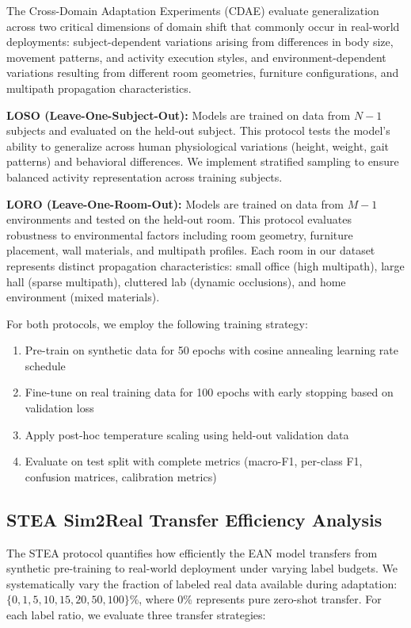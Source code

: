 \documentclass[lettersize,journal]{IEEEtran}
\begin{document}
The Cross-Domain Adaptation Experiments (CDAE) evaluate generalization across two critical dimensions of domain shift that commonly occur in real-world deployments: subject-dependent variations arising from differences in body size, movement patterns, and activity execution styles, and environment-dependent variations resulting from different room geometries, furniture configurations, and multipath propagation characteristics.

\textbf{LOSO (Leave-One-Subject-Out):} Models are trained on data from $N-1$ subjects and evaluated on the held-out subject. This protocol tests the model's ability to generalize across human physiological variations (height, weight, gait patterns) and behavioral differences. We implement stratified sampling to ensure balanced activity representation across training subjects.

\textbf{LORO (Leave-One-Room-Out):} Models are trained on data from $M-1$ environments and tested on the held-out room. This protocol evaluates robustness to environmental factors including room geometry, furniture placement, wall materials, and multipath profiles. Each room in our dataset represents distinct propagation characteristics: small office (high multipath), large hall (sparse multipath), cluttered lab (dynamic occlusions), and home environment (mixed materials).

For both protocols, we employ the following training strategy:
\begin{enumerate}
\item Pre-train on synthetic data for 50 epochs with cosine annealing learning rate schedule
\item Fine-tune on real training data for 100 epochs with early stopping based on validation loss
\item Apply post-hoc temperature scaling using held-out validation data
\item Evaluate on test split with complete metrics (macro-F1, per-class F1, confusion matrices, calibration metrics)
\end{enumerate}

\subsection{STEA Sim2Real Transfer Efficiency Analysis}

The STEA protocol quantifies how efficiently the EAN model transfers from synthetic pre-training to real-world deployment under varying label budgets. We systematically vary the fraction of labeled real data available during adaptation: $\{0, 1, 5, 10, 15, 20, 50, 100\}\%$, where 0\% represents pure zero-shot transfer. For each label ratio, we evaluate three transfer strategies:
\end{document}
